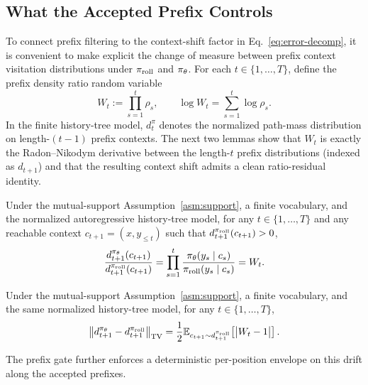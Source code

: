 \subsection{What the Accepted Prefix Controls}
\label{sec:prefix-mechanism}
To connect prefix filtering to the context-shift factor in Eq.~\eqref{eq:error-decomp}, it is convenient to make explicit the change of
measure between prefix context visitation distributions under $\pi_{\mathrm{roll}}$ and $\pi_{\theta}$. For each $t\in\{1,\ldots,T\}$, define the prefix
density ratio random variable
\begin{equation*}
    W_t := \prod_{s=1}^{t}\rho_s,
    \qquad
    \log W_t = \sum_{s=1}^{t}\log\rho_s.
\end{equation*}
In the finite history-tree model, $d_t^\pi$ denotes the normalized path-mass distribution on
length-$(t-1)$ prefix contexts. The next two lemmas show that $W_t$ is exactly the Radon--Nikodym derivative between the
length-$t$ prefix distributions (indexed as $d_{t+1}$) and that the resulting context shift admits a clean ratio-residual identity.

\begin{lemma}
\label{lem:prefix-density-ratio}
Under the mutual-support Assumption~\ref{asm:support}, a finite vocabulary, and the normalized autoregressive history-tree model,
for any $t\in\{1,\ldots,T\}$ and any reachable context $c_{t+1}=(x,y_{\le t})$ such that
$d_{t+1}^{\pi_{\mathrm{roll}}}(c_{t+1})>0$,
\begin{equation*}
    \frac{d_{t+1}^{\pi_{\theta}}(c_{t+1})}{d_{t+1}^{\pi_{\mathrm{roll}}}(c_{t+1})}
    = \prod_{s=1}^{t} \frac{\pi_{\theta}(y_s\mid c_s)}{\pi_{\mathrm{roll}}(y_s\mid c_s)}
    = W_t.
\end{equation*}
\end{lemma}

\begin{lemma}
\label{lem:tv-prefix-ratio}
Under the mutual-support Assumption~\ref{asm:support}, a finite vocabulary, and the same normalized history-tree model, for any
$t\in\{1,\ldots,T\}$,
\begin{equation*}
    \bigl\|d_{t+1}^{\pi_{\theta}} - d_{t+1}^{\pi_{\mathrm{roll}}}\bigr\|_{\mathrm{TV}}
    =
    \frac{1}{2}\mathbb{E}_{c_{t+1}\sim d_{t+1}^{\pi_{\mathrm{roll}}}}\!\left[\big|W_t - 1\big|\right].
\end{equation*}
\end{lemma}

The prefix gate further enforces a deterministic per-position envelope on this drift along the accepted prefixes.

